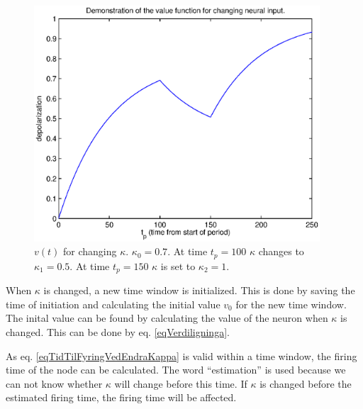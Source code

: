 \begin{figure}[hbt!p]
	\centering
	\includegraphics[width=0.95\textwidth]{demonstrasjonAvUlikeKappaforVerdifunksjonen.eps}
	\caption{$v(t)$ for changing $\kappa$. $\kappa_0=0.7$. At time $t_p=100$ $\kappa$ changes to $\kappa_1=0.5$. 
			At time $t_p=150$ $\kappa$ is set to $\kappa_2=1$.}
	\label{figVerdifunksjonen}
\end{figure}


When $\kappa$ is changed, a new time window is initialized.
This is done by saving the time of initiation and calculating the initial value $v_0$ for the new time window.
The inital value can be found by calculating the value of the neuron when $\kappa$ is changed.
This can be done by eq. \eqref{eqVerdiligninga}.

As eq.  \eqref{eqTidTilFyringVedEndraKappa} is valid within a time window, the firing time of the node can be calculated. 
The word ``estimation'' is used because we can not know whether $\kappa$ will change before this time.
If $\kappa$ is changed before the estimated firing time, the firing time will be affected. 



